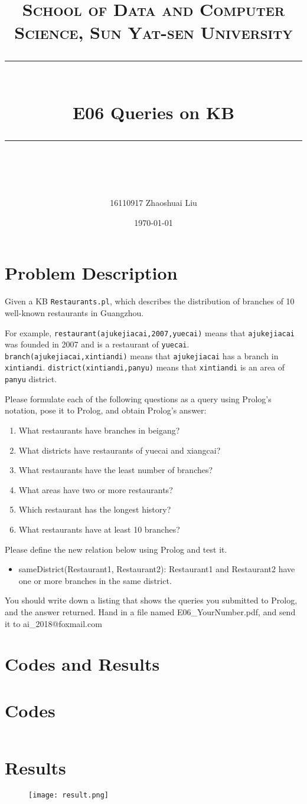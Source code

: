 ﻿\documentclass[a4paper, 11pt]{article}
\title{	
\normalfont \normalsize
\textsc{School of Data and Computer Science, Sun Yat-sen University} \\ [25pt] %
\rule{\textwidth}{0.5pt} \\[0.4cm] %
\huge  E06 Queries on KB \\ %
\rule{\textwidth}{2pt} \\[0.5cm] %
\author{16110917 Zhaoshuai Liu}
\date{\normalsize\today}
}
\begin{document}
\maketitle
\tableofcontents
\newpage


\section{Problem Description}
Given a KB \texttt{Restaurants.pl}, which describes the distribution of branches of 10 well-known restaurants in Guangzhou.

For example, \texttt{restaurant(ajukejiacai,2007,yuecai)} means that \texttt{ajukejiacai} was founded in 2007 and is a restaurant of \texttt{yuecai}. \texttt{branch(ajukejiacai,xintiandi)} means that \texttt{ajukejiacai} has a branch in \texttt{xintiandi}. \texttt{district(xintiandi,panyu)} means that \texttt{xintiandi} is an area of \texttt{panyu} district.

Please formulate each of the following questions as a query using Prolog's notation, pose it to Prolog, and obtain Prolog's answer:
\begin{enumerate}
  \item What restaurants have branches in beigang?
  \item What districts have restaurants of yuecai and xiangcai?
  \item What restaurants have the least number of branches?
  \item What areas have two or more restaurants?
\item Which restaurant has the longest history?
\item What restaurants have at least 10 branches?
\end{enumerate}
Please define the new relation below using Prolog and test it.
\begin{itemize}
\item sameDistrict(Restaurant1, Restaurant2): Restaurant1 and Restaurant2 have one or more branches in the same district.
\end{itemize}




You should write down a listing that shows the queries you submitted to Prolog, and the answer returned. Hand in a file named \textsf{E06\_YourNumber.pdf}, and send it to \textsf{ai\_2018@foxmail.com}


\section{Codes and Results}
\section{Codes}
\lstset{language=prolog}
\begin{lstlisting}

\end{lstlisting}

\section{Results}
\begin{figure}[h]
\centering
\texttt{[image: result.png]}
\end{figure}
%
%
\end{document}
